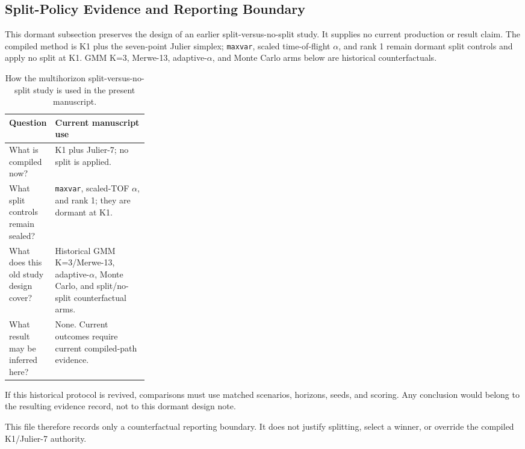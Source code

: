 
\subsection{Split-Policy Evidence and Reporting Boundary}
\label{se:usfos_vs_nosplit_shortarc}

This dormant subsection preserves the design of an earlier split-versus-no-split study. It supplies no current production or result claim. The compiled method is K1 plus the seven-point Julier simplex; \texttt{maxvar}, scaled time-of-flight \(\alpha\), and rank 1 remain dormant split controls and apply no split at K1. GMM K=3, Merwe-13, adaptive-\(\alpha\), and Monte Carlo arms below are historical counterfactuals.

\begin{table}[htb]
    \centering
    \caption[How the multihorizon split study is used here]{How the multihorizon split-versus-no-split study is used in the present manuscript.}
    \label{tab:multihorizon_hf_ranking}
    \small
    \begin{tabularx}{0.96\linewidth}{@{}L{0.27\linewidth}Y@{}}
        \toprule
        \textbf{Question} & \textbf{Current manuscript use} \\
        \midrule
        What is compiled now? & K1 plus Julier-7; no split is applied. \\
        What split controls remain sealed? & \texttt{maxvar}, scaled-TOF \(\alpha\), and rank 1; they are dormant at K1. \\
        What does this old study design cover? & Historical GMM K=3/Merwe-13, adaptive-\(\alpha\), Monte Carlo, and split/no-split counterfactual arms. \\
        What result may be inferred here? & None. Current outcomes require current compiled-path evidence. \\
        \bottomrule
    \end{tabularx}
\end{table}

If this historical protocol is revived, comparisons must use matched scenarios, horizons, seeds, and scoring. Any conclusion would belong to the resulting evidence record, not to this dormant design note.

This file therefore records only a counterfactual reporting boundary. It does not justify splitting, select a winner, or override the compiled K1/Julier-7 authority.
